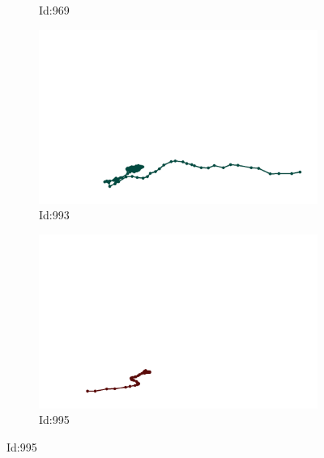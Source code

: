 \documentclass[12pt,twoside]{report}
\begin{document}
\begin{figure}
\begin{subfigure}[b]{0.20\textwidth}
\caption{Id:969}
\end{subfigure}
\begin{subfigure}[b]{0.20\textwidth}
\centering
\includegraphics[width=\textwidth]{../trajectories/993.png}
\caption{Id:993}
\end{subfigure}
\begin{subfigure}[b]{0.20\textwidth}
\centering
\includegraphics[width=\textwidth]{../trajectories/995.png}
\caption{Id:995}
\end{subfigure}
\end{figure}
\begin{figure}
\end{figure}
\end{document}
